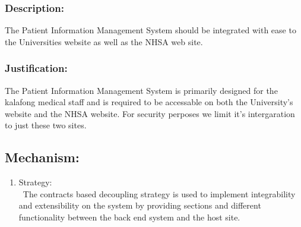 \subsubsection *{Description:}
	  The Patient Information Management System should be integrated with ease to the Universities website as well as the NHSA web site.
	 \subsubsection *{Justification:}
	   The Patient Information Management System is primarily designed for the kalafong medical staff and is required to be accessable on both the University's website and the NHSA website. For security perposes we limit it's intergaration to just these two sites.
	\subsection *{Mechanism:}
	\begin{enumerate}
		\item Strategy: \\\ The contracts based decoupling strategy is used to implement integrability and extensibility on the system by providing sections and different functionality between the back end system and the host site. 
	\end{enumerate}